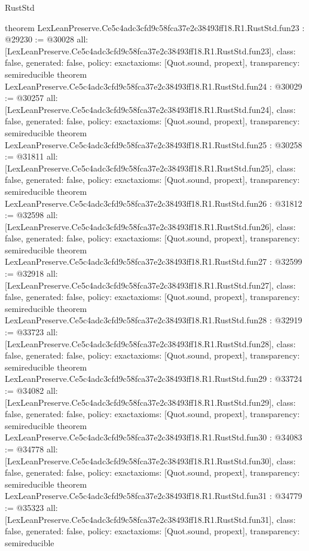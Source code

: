 \begin{lexlean}{RustStd}
\begin{coremodule}
{}
theorem LexLeanPreserve.Ce5c4adc3cfd9c58fca37e2c38493ff18.R1.RustStd.fun23 : @29230 := @30028 {
  all: [LexLeanPreserve.Ce5c4adc3cfd9c58fca37e2c38493ff18.R1.RustStd.fun23],
  class: false,
  generated: false,
  policy: exact{axioms: [Quot.sound, propext]},
  transparency: semireducible
}
theorem LexLeanPreserve.Ce5c4adc3cfd9c58fca37e2c38493ff18.R1.RustStd.fun24 : @30029 := @30257 {
  all: [LexLeanPreserve.Ce5c4adc3cfd9c58fca37e2c38493ff18.R1.RustStd.fun24],
  class: false,
  generated: false,
  policy: exact{axioms: [Quot.sound, propext]},
  transparency: semireducible
}
theorem LexLeanPreserve.Ce5c4adc3cfd9c58fca37e2c38493ff18.R1.RustStd.fun25 : @30258 := @31811 {
  all: [LexLeanPreserve.Ce5c4adc3cfd9c58fca37e2c38493ff18.R1.RustStd.fun25],
  class: false,
  generated: false,
  policy: exact{axioms: [Quot.sound, propext]},
  transparency: semireducible
}
theorem LexLeanPreserve.Ce5c4adc3cfd9c58fca37e2c38493ff18.R1.RustStd.fun26 : @31812 := @32598 {
  all: [LexLeanPreserve.Ce5c4adc3cfd9c58fca37e2c38493ff18.R1.RustStd.fun26],
  class: false,
  generated: false,
  policy: exact{axioms: [Quot.sound, propext]},
  transparency: semireducible
}
theorem LexLeanPreserve.Ce5c4adc3cfd9c58fca37e2c38493ff18.R1.RustStd.fun27 : @32599 := @32918 {
  all: [LexLeanPreserve.Ce5c4adc3cfd9c58fca37e2c38493ff18.R1.RustStd.fun27],
  class: false,
  generated: false,
  policy: exact{axioms: [Quot.sound, propext]},
  transparency: semireducible
}
theorem LexLeanPreserve.Ce5c4adc3cfd9c58fca37e2c38493ff18.R1.RustStd.fun28 : @32919 := @33723 {
  all: [LexLeanPreserve.Ce5c4adc3cfd9c58fca37e2c38493ff18.R1.RustStd.fun28],
  class: false,
  generated: false,
  policy: exact{axioms: [Quot.sound, propext]},
  transparency: semireducible
}
theorem LexLeanPreserve.Ce5c4adc3cfd9c58fca37e2c38493ff18.R1.RustStd.fun29 : @33724 := @34082 {
  all: [LexLeanPreserve.Ce5c4adc3cfd9c58fca37e2c38493ff18.R1.RustStd.fun29],
  class: false,
  generated: false,
  policy: exact{axioms: [Quot.sound, propext]},
  transparency: semireducible
}
theorem LexLeanPreserve.Ce5c4adc3cfd9c58fca37e2c38493ff18.R1.RustStd.fun30 : @34083 := @34778 {
  all: [LexLeanPreserve.Ce5c4adc3cfd9c58fca37e2c38493ff18.R1.RustStd.fun30],
  class: false,
  generated: false,
  policy: exact{axioms: [Quot.sound, propext]},
  transparency: semireducible
}
theorem LexLeanPreserve.Ce5c4adc3cfd9c58fca37e2c38493ff18.R1.RustStd.fun31 : @34779 := @35323 {
  all: [LexLeanPreserve.Ce5c4adc3cfd9c58fca37e2c38493ff18.R1.RustStd.fun31],
  class: false,
  generated: false,
  policy: exact{axioms: [Quot.sound, propext]},
  transparency: semireducible
}
\end{coremodule}
\end{lexlean}
